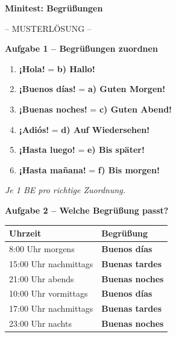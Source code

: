 \documentclass[11pt, a4paper]{article}
\newcommand{\punktebox}[1]{\hfill\fbox{\small \_\_\_/#1}}
\newcommand{\es}[1]{\textcolor{spanisch}{\textbf{#1}}}
\newcommand{\lsg}[1]{\textcolor{loesung}{\textbf{#1}}}
\begin{document}

\begin{center}
    {\Large\bfseries\textcolor{spanisch}{Minitest: Begrüßungen}}

    \vspace{5pt}
    {\large\textcolor{loesung}{-- MUSTERLÖSUNG --}}
\end{center}

\vspace{10pt}


\noindent\textbf{\textcolor{spanisch}{Aufgabe 1 -- Begrüßungen zuordnen}} \punktebox{6}

\vspace{10pt}

\begin{enumerate}[label=\arabic*.]
    \item \es{¡Hola!} = \lsg{b) Hallo!}
    \item \es{¡Buenos días!} = \lsg{a) Guten Morgen!}
    \item \es{¡Buenas noches!} = \lsg{c) Guten Abend!}
    \item \es{¡Adiós!} = \lsg{d) Auf Wiedersehen!}
    \item \es{¡Hasta luego!} = \lsg{e) Bis später!}
    \item \es{¡Hasta mañana!} = \lsg{f) Bis morgen!}
\end{enumerate}

\textit{Je 1 BE pro richtige Zuordnung.}

\vspace{15pt}


\noindent\textbf{\textcolor{spanisch}{Aufgabe 2 -- Welche Begrüßung passt?}} \punktebox{6}

\vspace{10pt}

\begin{tabularx}{\textwidth}{|l|X|}
\hline
\textbf{Uhrzeit} & \textbf{Begrüßung} \\
\hline
8:00 Uhr morgens & \lsg{Buenos días} \\
\hline
15:00 Uhr nachmittags & \lsg{Buenas tardes} \\
\hline
21:00 Uhr abends & \lsg{Buenas noches} \\
\hline
10:00 Uhr vormittags & \lsg{Buenos días} \\
\hline
17:00 Uhr nachmittags & \lsg{Buenas tardes} \\
\hline
23:00 Uhr nachts & \lsg{Buenas noches} \\
\hline
\end{tabularx}
\end{document}
